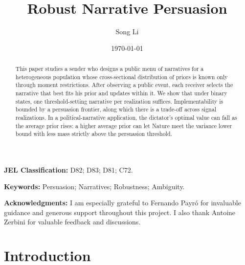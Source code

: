 \documentclass[12pt]{article}
\title{Robust Narrative Persuasion}
\author{Song Li\\[0.5em]
}
\date{\today}
\theoremstyle{break}
\begin{document}
\maketitle

\begin{abstract}
This paper studies a sender who designs a public menu of narratives for a heterogeneous population whose cross-sectional distribution of priors is known only through moment restrictions. After observing a public event, each receiver selects the narrative that best fits his prior and updates within it. We show that under binary states, one threshold-setting narrative per realization suffices. Implementability is bounded by a persuasion frontier, along which there is a trade-off across signal realizations. In a political-narrative application, the dictator's optimal value can fall as the average prior rises: a higher average prior can let Nature meet the variance lower bound with less mass strictly above the persuasion threshold.

\end{abstract}

\noindent\textbf{JEL Classification:} D82; D83; D81; C72.

\noindent\textbf{Keywords:} Persuasion; Narratives; Robustness; Ambiguity.

\vspace{0.75em}
\noindent\textbf{Acknowledgments:}
I am especially grateful to Fernando Payr\'{o} for invaluable guidance and generous support throughout this project. I also thank Antoine Zerbini for valuable feedback and discussions.

\section{Introduction}

% 
\end{document}
